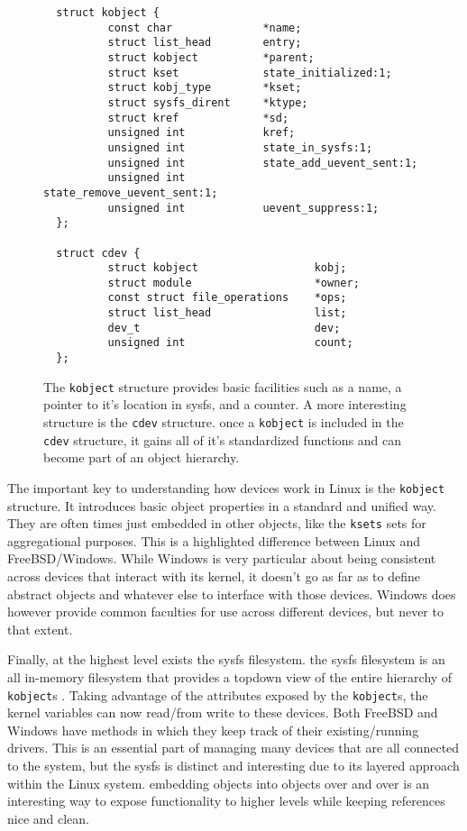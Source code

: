 \begin{figure}[h]
\begin{lstlisting}
  struct kobject {
          const char              *name;
          struct list_head        entry;
          struct kobject          *parent;
          struct kset             state_initialized:1;
          struct kobj_type        *kset;
          struct sysfs_dirent     *ktype;
          struct kref             *sd;
          unsigned int            kref;
          unsigned int            state_in_sysfs:1;
          unsigned int            state_add_uevent_sent:1;
          unsigned int            state_remove_uevent_sent:1;
          unsigned int            uevent_suppress:1;
  };

  struct cdev {
          struct kobject                  kobj;
          struct module                   *owner;
          const struct file_operations    *ops;
          struct list_head                list;
          dev_t                           dev;
          unsigned int                    count;
  };
\end{lstlisting}
\centering
\captionsetup{justification=centering}
\caption{
  The \texttt{kobject} structure provides basic facilities such as a name, a pointer to it's location in sysfs, and a counter.
  A more interesting structure is the \texttt{cdev} structure.
  once a \texttt{kobject} is included in the \texttt{cdev} structure, it gains all of it's standardized functions and can become part of an object hierarchy.
}
\label{code:kobject_struct}
\end{figure}

\par The important key to understanding how devices work in Linux is the \texttt{kobject} structure.
It introduces basic object properties in a standard and unified way.
They are often times just embedded in other objects, like the \texttt{ksets} sets for aggregational purposes.
This is a highlighted difference between Linux and FreeBSD/Windows.
While Windows is very particular about being consistent across devices that interact with its kernel, it doesn't go as far as to define abstract objects and whatever else to interface with those devices.
Windows does however provide common faculties for use across different devices, but never to that extent.

\par Finally, at the highest level exists the sysfs filesystem.
the sysfs filesystem is an all in-memory filesystem that provides a topdown view of the entire hierarchy of \texttt{kobject}s \cite{linux:1}.
Taking advantage of the attributes exposed by the \texttt{kobject}s, the kernel variables can now read/from write to these devices.
Both FreeBSD and Windows have methods in which they keep track of their existing/running drivers.
This is an essential part of managing many devices that are all connected to the system, but the sysfs is distinct and interesting due to its layered approach within the Linux system.
embedding objects into objects over and over is an interesting way to expose functionality to higher levels while keeping references nice and clean.

